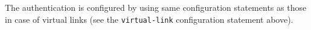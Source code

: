 \begin{description}
\begin{description}
\begin{description}
\begin{description}
\begin{description}
\begin{description}
The authentication is configured by using same configuration statements
as those in case of virtual links (see the {\tt virtual-link}
configuration statement above).





\end{description}
\end{description}
\end{description}
\end{description}
\end{description}
\end{description}
